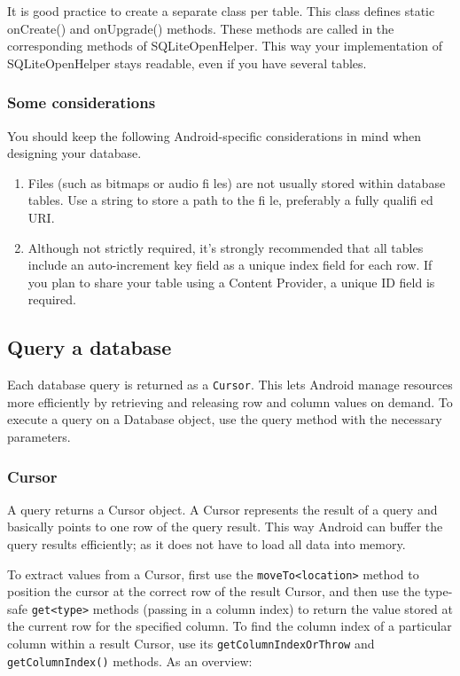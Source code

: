 \begin{framed}
It is good practice to create a separate class per table. This class defines static onCreate() and onUpgrade() methods. These methods are called in the corresponding methods of SQLiteOpenHelper. This way your implementation of SQLiteOpenHelper stays readable, even if you have several tables.
\end{framed}

\subsubsection{Some considerations}
You should keep the following Android-specific considerations in mind when designing your database.
\begin{enumerate}
	\item Files (such as bitmaps or audio fi les) are not usually stored within database tables. Use a string to store a path to the fi le, preferably a fully qualifi ed URI.
	\item Although not strictly required, it’s strongly recommended that all tables include an auto-increment key field as a unique index field for each row. If you plan to share your table using a Content Provider, a unique ID field is required.
\end{enumerate}

\subsection{Query a database}
Each database query is returned as a \texttt{Cursor}. This lets Android manage resources more efficiently by retrieving and releasing row and column values on demand. To execute a query on a Database object, use the query method with the necessary parameters.

\subsubsection{Cursor}
A query returns a Cursor object. A Cursor represents the result of a query and basically points to one row of the query result. This way Android can buffer the query results efficiently; as it does not have to load all data into memory.

To extract values from a Cursor, first use the \texttt{moveTo<location>} method to position the cursor at the correct row of the result Cursor, and then use the type-safe \texttt{get<type>} methods (passing in a column index) to return the value stored at the current row for the specified column. To find the column index of a particular column within a result Cursor, use its \texttt{getColumnIndexOrThrow} and \texttt{getColumnIndex()} methods. As an overview:


